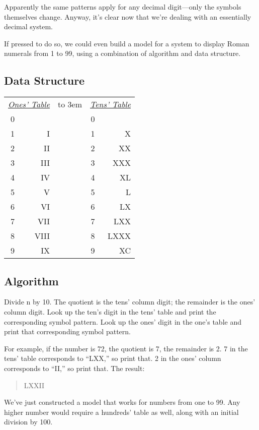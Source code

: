 Apparently the same patterns apply for any decimal digit---only the
symbols themselves change. Anyway, it's clear now that we're dealing with
an essentially decimal system.

If pressed to do so, we could even build a model for a system to display
Roman numerals from 1 to 99, using a combination of algorithm and
data structure.

\subsection{Data Structure}

\bigskip
\begin{tabular}{crccr}
\multicolumn{2}{c}{\underline{\emph{Ones' Table}}} &
\hbox to 3em{\hss} & \multicolumn{2}{c}{\underline{\emph{Tens' Table}}} \\
 0 &          & &     0 & \\
 1 &       I  & &     1 &      X \\
 2 &      II  & &     2 &     XX \\
 3 &     III  & &     3 &    XXX \\
 4 &      IV  & &     4 &     XL \\
 5 &       V  & &     5 &      L \\
 6 &      VI  & &     6 &     LX \\
 7 &     VII  & &     7 &    LXX \\
 8 &    VIII  & &     8 &   LXXX \\
 9 &      IX  & &     9 &     XC \\
\end{tabular}
\bigskip

\subsection{Algorithm}

Divide n by 10. The quotient is the tens' column digit; the remainder is
the ones' column digit. Look up the ten's digit in the tens' table and print
the corresponding symbol pattern. Look up the ones' digit in the one's
table and print that corresponding symbol pattern.

For example, if the number is 72, the quotient is 7, the remainder is
2. 7 in the tens' table corresponds to ``LXX,'' so print that. 2 in the ones'
column corresponds to ``II,'' so print that. The result:

\begin{quote}
{\sf LXXII}
\end{quote}
We've just constructed a model that works for numbers from one to 99.
Any higher number would require a hundreds' table as well, along with
an initial division by 100.

